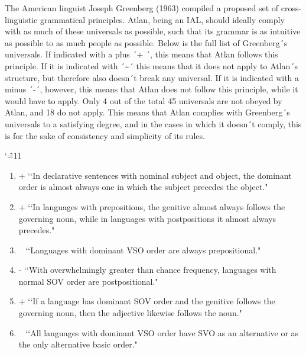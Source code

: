 The American linguist Joseph Greenberg (1963) compiled a proposed set of cross-linguistic grammatical principles. Atlan, being an IAL, should ideally comply with as much of these universals as possible, such that its grammar is as intuitive as possible to as much people as possible. Below is the full list of Greenberg´s universals. If indicated with a plus ´+ ´, this means that Atlan follows this principle. If it is indicated with ´\~{}´ this means that it does not apply to Atlan´s structure, but therefore also doesn´t break any universal. If it is indicated with a minus ´-´, however, this means that Atlan does not follow this principle, while it would have to apply. Only 4 out of the total 45 universals are not obeyed by Atlan, and 18 do not apply. This means that Atlan complies with Greenberg´s universals to a satisfying degree, and in the cases in which it doesn´t comply, this is for the sake of consistency and simplicity of its rules. 

\begingroup
\catcode`\~=11
\begin{enumerate}
\item +  \lq\lq In declarative sentences with nominal subject and object, the dominant order is almost always one in which the subject precedes the object." 

\item +  \lq\lq In languages with prepositions, the genitive almost always follows the governing noun, while in languages with postpositions it almost always precedes." 

\item ~  \lq\lq Languages with dominant VSO order are always prepositional." 

\item -  \lq\lq With overwhelmingly greater than chance frequency, languages with normal SOV order are postpositional." 

\item +  \lq\lq If a language has dominant SOV order and the genitive follows the governing noun, then the adjective likewise follows the noun." 

\item ~  \lq\lq All languages with dominant VSO order have SVO as an alternative or as the only alternative basic order." 
\end{enumerate}

